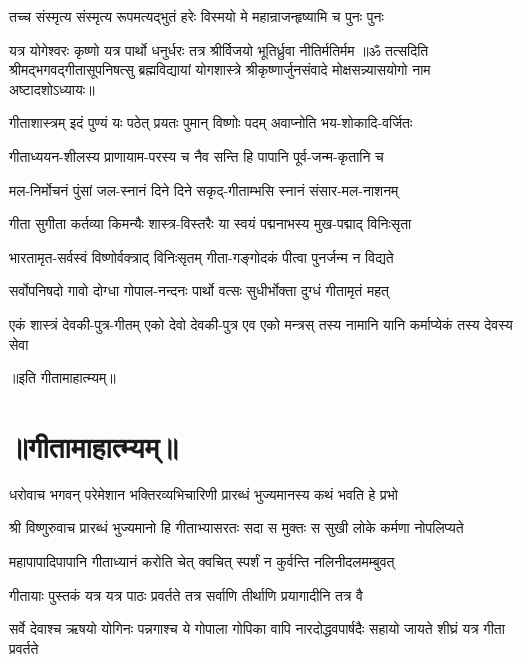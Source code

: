 \twolineshloka
{तच्च संस्मृत्य संस्मृत्य रूपमत्यद्भुतं हरेः}
{विस्मयो मे महान्राजन्हृष्यामि च पुनः पुनः}%

\twolineshloka
{यत्र योगेश्वरः कृष्णो यत्र पार्थो धनुर्धरः}
{तत्र श्रीर्विजयो भूतिर्ध्रुवा नीतिर्मतिर्मम}%
{॥ॐ तत्सदिति श्रीमद्भगवद्गीतासूपनिषत्सु ब्रह्मविद्यायां योगशास्त्रे श्रीकृष्णार्जुनसंवादे मोक्षसन्न्यासयोगो नाम अष्टादशोऽध्यायः॥}

\twolineshloka
{गीताशास्त्रम् इदं पुण्यं यः पठेत् प्रयतः पुमान्}
{विष्णोः पदम् अवाप्नोति भय-शोकादि-वर्जितः}%

\twolineshloka
{गीताध्ययन-शीलस्य प्राणायाम-परस्य च}
{नैव सन्ति हि पापानि पूर्व-जन्म-कृतानि च}%

\twolineshloka
{मल-निर्मोचनं पुंसां जल-स्नानं दिने दिने}
{सकृद्-गीताम्भसि स्नानं संसार-मल-नाशनम्}%

\twolineshloka
{गीता सुगीता कर्तव्या किमन्यैः शास्त्र-विस्तरैः}
{या स्वयं पद्मनाभस्य मुख-पद्माद् विनिःसृता}%

\twolineshloka
{भारतामृत-सर्वस्वं विष्णोर्वक्त्राद् विनिःसृतम्}
{गीता-गङ्गोदकं पीत्वा पुनर्जन्म न विद्यते}%

\twolineshloka
{सर्वोपनिषदो गावो दोग्धा गोपाल-नन्दनः}
{पार्थो वत्सः सुधीर्भोक्ता दुग्धं गीतामृतं महत्}%

\fourlineindentedshloka
{एकं शास्त्रं देवकी-पुत्र-गीतम्}
{एको देवो देवकी-पुत्र एव}
{एको मन्त्रस् तस्य नामानि यानि}
{कर्माप्येकं तस्य देवस्य सेवा}%

{॥इति गीतामाहात्म्यम्॥}

\section{॥गीतामाहात्म्यम्॥}
{धरोवाच}
\twolineshloka
{भगवन् परेमेशान भक्तिरव्यभिचारिणी}
{प्रारब्धं भुज्यमानस्य कथं भवति हे प्रभो}%

{श्री विष्णुरुवाच}
\twolineshloka
{प्रारब्धं भुज्यमानो हि गीताभ्यासरतः सदा}
{स मुक्तः स सुखी लोके कर्मणा नोपलिप्यते}%

\twolineshloka
{महापापादिपापानि गीताध्यानं करोति चेत्}
{क्वचित् स्पर्शं न कुर्वन्ति नलिनीदलमम्बुवत्}%

\twolineshloka
{गीतायाः पुस्तकं यत्र यत्र पाठः प्रवर्तते}
{तत्र सर्वाणि तीर्थाणि प्रयागादीनि तत्र वै}%

{सर्वे देवाश्च ऋषयो योगिनः पन्नगाश्च ये}
\twolineshloka
{गोपाला गोपिका वापि नारदोद्धवपार्षदैः}
{सहायो जायते शीघ्रं यत्र गीता प्रवर्तते}%


